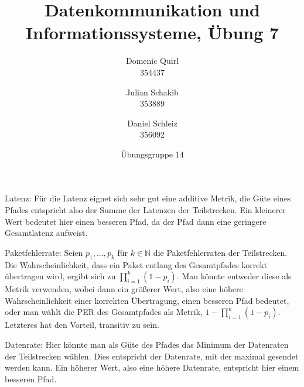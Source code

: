 \documentclass{../exercisesheet}
\title{Datenkommunikation und Informationssysteme, Übung 7}
\author{
    Domenic Quirl \\ 354437
    \and
    Julian Schakib \\ 353889
    \and 
    Daniel Schleiz \\ 356092
}
\date{Übungsgruppe 14}
\begin{document}
\maketitle
\pointtable


\begin{exercise}{1.5}
\begin{subexercise}
Latenz: Für die Latenz eignet sich sehr gut eine additive Metrik, die Güte eines Pfades entspricht also der Summe der Latenzen der Teilstrecken. Ein kleinerer Wert bedeutet hier einen besseren Pfad, da der Pfad dann eine geringere Gesamtlatenz aufweist.
\end{subexercise}
\begin{subexercise}
Paketfehlerrate: Seien $p_1,...,p_k$ für $k\in \mathbb{N}$ die Paketfehlerraten der Teilstrecken. Die Wahrscheinlichkeit, dass ein Paket entlang des Gesamtpfades korrekt übertragen wird, ergibt sich zu $\prod_{i=1}^k(1-p_i)$. Man könnte entweder diese als Metrik verwenden, wobei dann ein größerer Wert, also eine höhere Wahrscheinlichkeit einer korrekten Übertragung, einen besseren Pfad bedeutet, oder man wählt die PER des Gesamtpfades als Metrik, $1-\prod_{i=1}^k(1-p_i)$. Letzteres hat den Vorteil, transitiv zu sein.
\end{subexercise}
\begin{subexercise}
Datenrate: Hier könnte man als Güte des Pfades das Minimum der Datenraten der Teilstrecken wählen. Dies entspricht der Datenrate, mit der maximal gesendet werden kann. Ein höherer Wert, also eine höhere Datenrate, entspricht hier einem besseren Pfad.
\end{subexercise}
\end{exercise}
\end{document}
